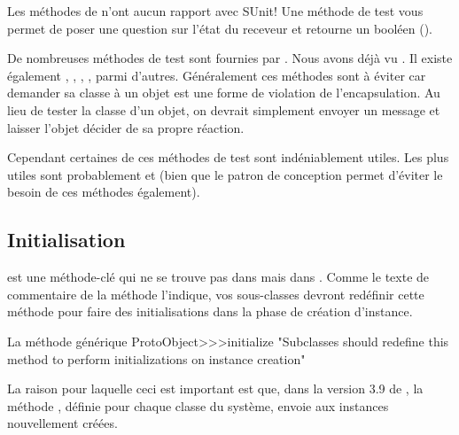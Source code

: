 \documentclass[a4paper,10pt,twoside]{book}
\begin{document}
Les m\'ethodes de  n'ont aucun rapport avec SUnit! Une m\'ethode de test vous permet de poser une question sur l'\'etat du receveur et retourne un bool\'een ().

De nombreuses m\'ethodes de test sont fournies par . Nous avons d\'ej\`a vu . Il existe \'egalement , , , , parmi d'autres. G\'en\'eralement ces m\'ethodes sont \`a \'eviter car demander sa classe \`a un objet est une forme de violation de l'encapsulation. Au lieu de tester la classe d'un objet, on devrait simplement envoyer un message et laisser l'objet d\'ecider de sa propre r\'eaction.

Cependant certaines de ces m\'ethodes de test sont ind\'eniablement utiles. Les plus utiles sont probablement  et  (bien que le patron de conception \cite{Wool98a} permet d'\'eviter le besoin de ces m\'ethodes \'egalement).


\subsection{Initialisation}
 est une m\'ethode-cl\'e qui ne se
trouve pas dans  mais dans .
Comme le texte de commentaire de la m\'ethode l'indique, vos sous-classes
devront red\'efinir cette m\'ethode pour faire des initialisations
dans la phase de cr\'eation d'instance.

\begin{method}{La m\'ethode g\'en\'erique }
ProtoObject>>>initialize
    "Subclasses should redefine this method to perform initializations on instance creation"
\end{method}

La raison pour laquelle ceci est important est que, dans la version 3.9 de \sq, la m\'ethode , d\'efinie pour chaque classe du syst\`eme, envoie  aux instances nouvellement cr\'e\'ees.
\end{document}
